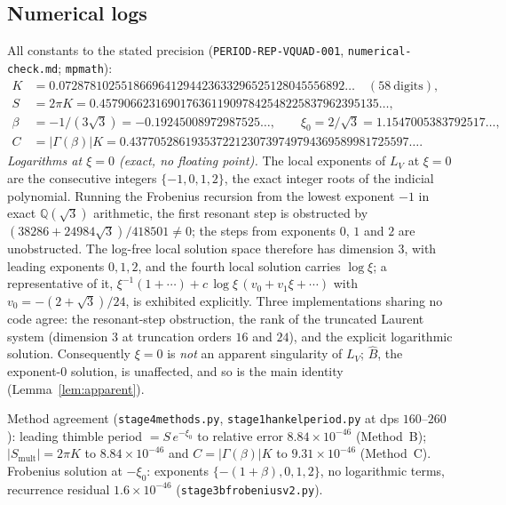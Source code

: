 \documentclass[11pt,reqno]{amsart}
\renewcommand{\_}{\vquadorigunderscore\allowbreak}
\theoremstyle{plain}
\theoremstyle{definition}
\newcommand{\Bhat}{\widehat{B}}
\newcommand{\LV}{L_{V}}
\newcommand{\Qsqrt}{\mathbb{Q}(\sqrt3)}
\newcommand{\xizero}{\xi_0}
\providecommand{\C}{}\renewcommand{\C}{C}
\begin{document}
\subsection{Numerical logs}\label{app:numlogs}
All constants to the stated precision (\texttt{PERIOD-REP-VQUAD-001},
\texttt{numerical-check.md}; \texttt{mpmath}):
{\small
\[
\begin{aligned}
  K&=0.0728781025518669641294423633296525128045556892\ldots\quad(58\ \text{digits}),\\
  S&=2\pi K=0.457906623169017636119097842548225837962395135\ldots,\\
  \beta&=-1/(3\sqrt3)=-0.19245008972987525\ldots,\qquad \xizero=2/\sqrt3=1.1547005383792517\ldots,\\
  \C&=\lvert\Gamma(\beta)\rvert K=0.437705286193537221230739749794369589981725597\ldots.
\end{aligned}
\]
}
\emph{Logarithms at $\xi=0$ (exact, no floating point).} The local exponents of $\LV$ at
$\xi=0$ are the consecutive integers $\{-1,0,1,2\}$, the exact integer roots of the indicial
polynomial. Running the Frobenius recursion from the lowest exponent $-1$ in exact $\Qsqrt$
arithmetic, the first resonant step is obstructed by
$(38286+24984\sqrt3)/418501\ne0$; the steps from exponents $0$, $1$ and $2$ are unobstructed.
The log-free local solution space therefore has dimension $3$, with leading exponents
$0,1,2$, and the fourth local solution carries $\log\xi$; a representative of it,
$\xi^{-1}(1+\cdots)+c\,\log\xi\,(v_0+v_1\xi+\cdots)$ with $v_0=-(2+\sqrt3)/24$, is exhibited
explicitly. Three implementations sharing no code agree: the resonant-step obstruction, the
rank of the truncated Laurent system (dimension $3$ at truncation orders $16$ and $24$), and
the explicit logarithmic solution. Consequently $\xi=0$ is \emph{not} an apparent singularity
of $\LV$; $\Bhat$, the exponent-$0$ solution, is unaffected, and so is the main identity
(Lemma~\ref{lem:apparent}).

Method agreement (\texttt{stage4\_methods.py}, \texttt{stage1\_hankel\_period.py} at dps
$160$--$260$): leading thimble period $=S\,e^{-\xizero}$ to relative error $8.84\times10^{-46}$
(Method~B); $\lvert S_{\mathrm{mult}}\rvert=2\pi K$ to $8.84\times10^{-46}$ and
$\C=\lvert\Gamma(\beta)\rvert K$ to $9.31\times10^{-46}$ (Method~C). Frobenius solution at
$-\xizero$: exponents $\{-(1+\beta),0,1,2\}$, no logarithmic terms, recurrence residual
$1.6\times10^{-46}$ (\texttt{stage3b\_frobenius\_v2.py}).
\end{document}
